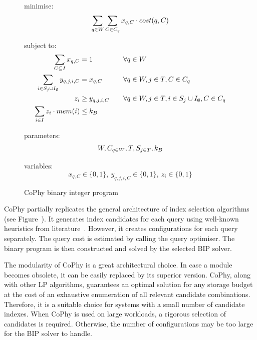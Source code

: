 \begin{figure}[!ht]
\begin{framed}
\raggedright
minimise:
$$
    \sum_{q \in W} \sum_{C \in C_q} x_{q,C} \cdot cost(q,C)
$$

subject to:
\begin{alignat*}{2}
    \sum_{C \subseteq I} x_{q,C} &= 1 &&\quad \forall q \in W \\
    \sum_{i \in S_j \cup I_{\emptyset}} y_{q,j,i,C} &= x_{q, C} &&\quad \forall q \in W, j \in T, C \in C_q \\
    z_i &\geq y_{q,j,i,C} &&\quad \forall q \in W, j \in T, i \in S_j \cup I_{\emptyset}, C \in C_q \\
    \sum_{i \in I} z_i \cdot mem(i) &\leq k_B &&
\end{alignat*}

parameters:
$$
  W, C_{q \in W}, T,  S_{j \in T}, k_B
$$

variables:
$$
    x_{q,C} \in \{0, 1\}, \   y_{q,j,i,C} \in \{0, 1\}, \ z_i \in \{0, 1\}
$$
\end{framed}
\caption{CoPhy binary integer program}
\end{figure}

CoPhy partially replicates the general architecture of index selection algorithms (see Figure~). It generates index candidates for each query using well-known heuristics from literature~\citep{candidateSelection}. However, it creates configurations for each query separately. The query cost is estimated by calling the query optimiser. The binary program is then constructed and solved by the selected BIP solver.

The modularity of CoPhy is a great architectural choice. In case a module becomes obsolete, it can be easily replaced by its superior version. CoPhy, along with other LP algorithms, guarantees an optimal solution for any storage budget at the cost of an exhaustive enumeration of all relevant candidate combinations. Therefore, it is a suitable choice for systems with a small number of candidate indexes. When CoPhy is used on large workloads, a rigorous selection of candidates is required. Otherwise, the number of configurations may be too large for the BIP solver to handle.

